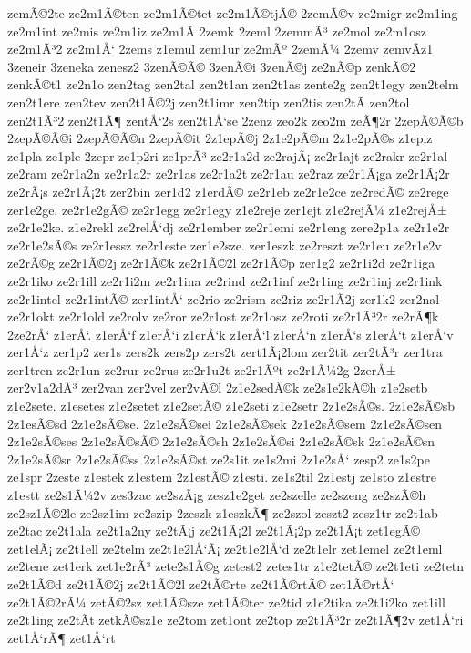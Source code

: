 {zemÃ©2te
ze2m1Ã©ten
ze2m1Ã©tet
ze2m1Ã©tjÃ©
2zemÃ©v
ze2migr
ze2m1ing
ze2m1int
ze2mis
ze2m1iz
ze2m1Ã­
2zemk
2zeml
2zemmÃ³
ze2mol
ze2m1osz
ze2m1Ã³2
ze2m1Å‘
2zems
z1emul
zem1ur
ze2mÃº
2zemÃ¼
2zemv
zemvÃ­z1
3zeneir
3zeneka
zenesz2
3zenÃ©Ã©
3zenÃ©i
3zenÃ©j
ze2nÃ©p
zenkÃ©2
zenkÃ©t1
ze2n1o
zen2tag
zen2tal
zen2t1an
zen2t1as
zente2g
zen2t1egy
zen2telm
zen2t1ere
zen2tev
zen2t1Ã©2j
zen2t1imr
zen2tip
zen2tis
zen2tÃ­
zen2tol
zen2t1Ã³2
zen2t1Ã¶
zentÅ‘2s
zen2t1Å‘se
2zenz
zeo2k
zeo2m
zeÃ¶2r
2zepÃ©Ã©b
2zepÃ©Ã©i
2zepÃ©Ã©n
2zepÃ©it
2z1epÃ©j
2z1e2pÃ©m
2z1e2pÃ©s
z1epiz
ze1pla
ze1ple
2zepr
ze1p2ri
ze1prÃ³
ze2r1a2d
ze2rajÃ¡
ze2r1ajt
ze2rakr
ze2r1al
ze2ram
ze2r1a2n
ze2r1a2r
ze2r1as
ze2r1a2t
ze2r1au
ze2raz
ze2r1Ã¡ga
ze2r1Ã¡2r
ze2rÃ¡s
ze2r1Ã¡2t
zer2bin
zer1d2
z1erdÃ©
ze2r1eb
ze2r1e2ce
ze2redÃ©
ze2rege
zer1e2ge.
ze2r1e2gÃ©
ze2r1egg
ze2r1egy
z1e2reje
zer1ejt
z1e2rejÃ¼
z1e2rejÅ±
ze2r1e2ke.
z1e2rekl
ze2relÅ‘dj
ze2r1ember
ze2r1emi
ze2r1eng
zere2p1a
ze2r1e2r
ze2r1e2sÃ©s
ze2r1essz
ze2r1este
zer1e2sze.
zer1eszk
ze2reszt
ze2r1eu
ze2r1e2v
ze2rÃ©g
ze2r1Ã©2j
ze2r1Ã©k
ze2r1Ã©2l
ze2r1Ã©p
zer1g2
ze2r1i2d
ze2r1iga
ze2r1iko
ze2r1ill
ze2r1i2m
ze2r1ina
ze2rind
ze2r1inf
ze2r1ing
ze2r1inj
ze2r1ink
ze2r1intel
ze2r1intÃ©
zer1intÅ‘
ze2rio
ze2rism
ze2riz
ze2r1Ã­2j
zer1k2
zer2nal
ze2r1okt
ze2r1old
ze2rolv
ze2ror
ze2r1ost
ze2r1osz
ze2roti
ze2r1Ã³2r
ze2rÃ¶k
2ze2rÅ‘
z1erÅ‘.
z1erÅ‘f
z1erÅ‘i
z1erÅ‘k
z1erÅ‘l
z1erÅ‘n
z1erÅ‘s
z1erÅ‘t
z1erÅ‘v
zer1Å‘z
zer1p2
zer1s
zers2k
zers2p
zers2t
zert1Ã¡2lom
zer2tit
zer2tÃ³r
zer1tra
zer1tren
ze2r1un
ze2rur
ze2rus
ze2r1u2t
ze2r1Ãºt
ze2r1Ã¼2g
2zerÅ±
zer2v1a2dÃ³
zer2van
zer2vel
zer2vÃ©l
2z1e2sedÃ©k
ze2s1e2kÃ©h
z1e2setb
z1e2sete.
z1esetes
z1e2setet
z1e2setÃ©
z1e2seti
z1e2setr
2z1e2sÃ©s.
2z1e2sÃ©sb
2z1esÃ©sd
2z1e2sÃ©se.
2z1e2sÃ©sei
2z1e2sÃ©sek
2z1e2sÃ©sem
2z1e2sÃ©sen
2z1e2sÃ©ses
2z1e2sÃ©sÃ©
2z1e2sÃ©sh
2z1e2sÃ©si
2z1e2sÃ©sk
2z1e2sÃ©sn
2z1e2sÃ©sr
2z1e2sÃ©ss
2z1e2sÃ©st
ze2s1it
ze1s2mi
2z1e2sÅ‘
zesp2
ze1s2pe
ze1spr
2zeste
z1estek
z1estem
2z1estÃ©
z1esti.
ze1s2til
2z1estj
ze1sto
z1estre
z1estt
ze2s1Ã¼2v
zes3zac
ze2szÃ¡g
zesz1e2get
ze2szelle
ze2szeng
ze2szÃ©h
ze2sz1Ã©2le
ze2sz1im
ze2szip
2zeszk
z1eszkÃ¶
ze2szol
zeszt2
zesz1tr
ze2t1ab
ze2tac
ze2t1ala
ze2t1a2ny
ze2tÃ¡j
ze2t1Ã¡2l
ze2t1Ã¡2p
ze2t1Ã¡t
zet1egÃ©
zet1elÃ¡
ze2t1ell
ze2telm
ze2t1e2lÅ‘Ã¡
ze2t1e2lÅ‘d
ze2t1elr
zet1emel
ze2t1eml
ze2tene
zet1erk
zet1e2rÃ³
zete2s1Ã©g
zetest2
zetes1tr
z1e2tetÃ©
ze2t1eti
ze2tetn
ze2t1Ã©d
ze2t1Ã©2j
ze2t1Ã©2l
ze2tÃ©rte
ze2t1Ã©rtÃ©
zet1Ã©rtÅ‘
ze2t1Ã©2rÃ¼
zetÃ©2sz
zet1Ã©sze
zet1Ã©ter
ze2tid
z1e2tika
ze2t1i2ko
zet1ill
ze2t1ing
ze2tÃ­t
zetkÃ©sz1e
ze2tom
zet1ont
ze2top
ze2t1Ã³2r
ze2t1Ã¶2v
zet1Å‘ri
zet1Å‘rÃ¶
zet1Å‘rt
}
